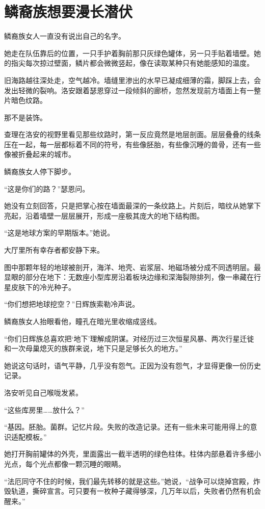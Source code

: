 \chapter{鳞裔族想要漫长潜伏}

鳞裔族女人一直没有说出自己的名字。

她走在队伍靠后的位置，一只手护着胸前那只灰绿色罐体，另一只手贴着墙壁。她的指尖每次掠过壁面，鳞片都会微微竖起，像在读取某种只有她能感知的温度。

旧海路越往深处走，空气越冷。墙缝里渗出的水早已凝成细薄的霜，脚踩上去，会发出轻微的裂响。洛安跟着瑟恩穿过一段倾斜的廊桥，忽然发现前方墙面上有一整片暗色纹路。

那不是装饰。

查理在洛安的视野里看见那些纹路时，第一反应竟然是地层剖面。层层叠叠的线条压在一起，每一层都标着不同的符号，有些像胚胎，有些像沉睡的兽骨，还有一些像被折叠起来的城市。

鳞裔族女人停下脚步。

“这是你们的路？”瑟恩问。

她没有立刻回答，只是把掌心按在墙面最深的一条纹路上。片刻后，暗纹从她掌下亮起，沿着墙壁一层层展开，形成一座极其庞大的地下结构图。

“这是地球方案的早期版本。”她说。

大厅里所有幸存者都安静下来。

图中那颗年轻的地球被剖开，海洋、地壳、岩浆层、地磁场被分成不同透明层。最显眼的部分在地下：无数座小型库房沿着板块边缘和深海裂隙排列，像一串藏在行星皮肤下的冷光种子。

“你们想把地球挖空？”日辉族索勒冷声说。

鳞裔族女人抬眼看他，瞳孔在暗光里收缩成竖线。

“你们日辉族总喜欢把‘地下’理解成阴谋。对经历过三次恒星风暴、两次行星迁徙和一次母巢熄灭的族群来说，地下只是足够长久的地方。”

她说这句话时，语气平静，几乎没有怨气。正因为没有怨气，才显得更像一份历史记录。

洛安听见自己喉咙发紧。

“这些库房里……放什么？”

“基因。胚胎。菌群。记忆片段。失败的改造记录。还有一些未来可能用得上的意识适配模板。”

她打开胸前罐体的外壳，里面露出一截半透明的绿色柱体。柱体内部悬着许多细小光点，每个光点都像一颗沉睡的眼睛。

“法厄同守不住的时候，我们最先转移的就是这些。”她说，“战争可以烧掉宫殿，炸毁轨道，撕碎宣言。可只要有一枚种子藏得够深，几万年以后，失败者仍然有机会醒来。”

